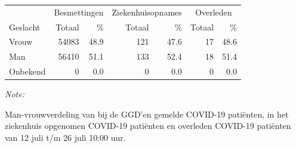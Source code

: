 \documentclass[
  english,
  man,floatsintext]{apa6}
\begin{document}
\begin{table}
\centering\begingroup\fontsize{11}{13}\selectfont

\begin{threeparttable}
\begin{tabular}{lrrrrrr}
\toprule
\multicolumn{1}{c}{ } & \multicolumn{2}{c}{Besmettingen} & \multicolumn{2}{c}{Ziekenhuisopnames} & \multicolumn{2}{c}{Overleden} \\
\cmidrule(l{3pt}r{3pt}){2-3} \cmidrule(l{3pt}r{3pt}){4-5} \cmidrule(l{3pt}r{3pt}){6-7}
Geslacht & Totaal & \% & Totaal & \% & Totaal & \%\\
\midrule
Vrouw & 54083 & 48.9 & 121 & 47.6 & 17 & 48.6\\
Man & 56410 & 51.1 & 133 & 52.4 & 18 & 51.4\\
Onbekend & 0 & 0.0 & 0 & 0.0 & 0 & 0.0\\
\bottomrule
\end{tabular}
\begin{tablenotes}
\item \textit{Note: } 
\item Man-vrouwverdeling van bij de GGD’en gemelde COVID-19 patiënten, in het ziekenhuis opgenomen COVID-19 patiënten en overleden COVID-19 patiënten van 12 juli t/m 26 juli 10:00 uur.
\end{tablenotes}
\end{threeparttable}
\endgroup{}
\end{table}
\newpage
\end{document}
